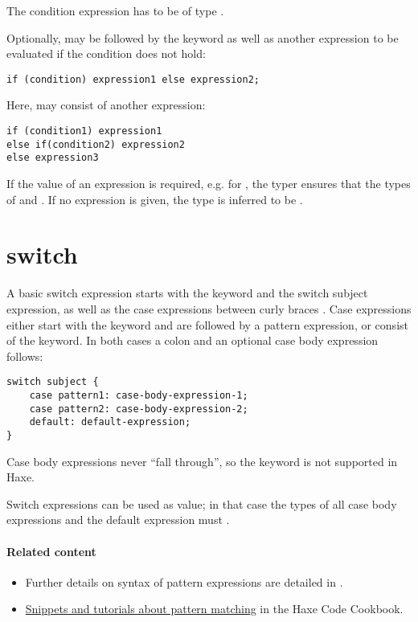 The condition expression has to be of type .

Optionally,  may be followed by the  keyword as well as another expression to be evaluated if the condition does not hold:

\begin{lstlisting}
if (condition) expression1 else expression2;
\end{lstlisting}

Here,  may consist of another  expression:

\begin{lstlisting}
if (condition1) expression1
else if(condition2) expression2
else expression3
\end{lstlisting}

If the value of an  expression is required, e.g. for , the typer ensures that the types of  and  . If no  expression is given, the type is inferred to be .


\section{switch}
\label{expression-switch}

A basic switch expression starts with the  keyword and the switch subject expression, as well as the case expressions between curly braces \expr{\{\}}. Case expressions either start with the  keyword and are followed by a pattern expression, or consist of the  keyword. In both cases a colon \expr{:} and an optional case body expression follows:

\begin{lstlisting}
switch subject {
	case pattern1: case-body-expression-1;
	case pattern2: case-body-expression-2;
	default: default-expression;
}
\end{lstlisting}

Case body expressions never ``fall through'', so the  keyword is not supported in Haxe.

Switch expressions can be used as value; in that case the types of all case body expressions and the default expression must .

\paragraph{Related content}
\begin{itemize}
	\item Further details on syntax of pattern expressions are detailed in .
	\item \href{http://code.haxe.org/tag/pattern-matching.html}{Snippets and tutorials about pattern matching} in the Haxe Code Cookbook.
\end{itemize}


